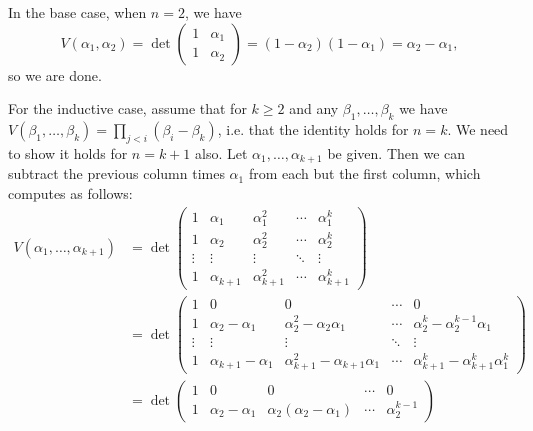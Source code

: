 \documentclass[a4paper, 11pt]{homework}
\begin{document}
\begin{questions}
\begin{solution}
		In the base case, when \(n = 2\), we have
		\[
			V(\alpha_1, \alpha_2) = \det\begin{pmatrix}
				1 & \alpha_1 \\
				1 & \alpha_2
			\end{pmatrix} = (1 - \alpha_2)(1 - \alpha_1) = \alpha_2 - \alpha_1,
		\]
		so we are done.

		For the inductive case, assume that for \(k \ge 2\) and any \(\beta_1,\dots,
		\beta_k\) we have \(V(\beta_1,\dots,\beta_k) = \prod_{j < i} (\beta_i - \beta_k)\), i.e. that the identity
		holds for \(n = k\). We need to show it holds for \(n = k + 1\) also. Let \(\alpha_1,\dots,\alpha_{k+1}\)
		be given. Then we can subtract the previous column times \(\alpha_1\) from each but the first column, which
		computes as follows:
		\begin{align*}
			V(\alpha_1,\dots,\alpha_{k+1})
			 & = \det\begin{pmatrix}
				1      & \alpha_1     & \alpha_1^2     & \cdots & \alpha_1^k     \\
				1      & \alpha_2     & \alpha_2^2     & \cdots & \alpha_2^k     \\
				\vdots & \vdots       & \vdots         & \ddots & \vdots         \\
				1      & \alpha_{k+1} & \alpha_{k+1}^2 & \cdots & \alpha_{k+1}^k
			\end{pmatrix} \\
			 & = \det\begin{pmatrix}
				1      & 0                       & 0                                     & \cdots & 0                \\
				1      & \alpha_2 - \alpha_1     & \alpha_2^2 - \alpha_2\alpha_1         & \cdots & \alpha_2^k -
				\alpha_2^{k-1}\alpha_1                                                                               \\
				\vdots & \vdots                  & \vdots                                & \ddots & \vdots           \\
				1      & \alpha_{k+1} - \alpha_1 & \alpha_{k+1}^2 - \alpha_{k+1}\alpha_1 & \cdots & \alpha_{k+1}^k -
				\alpha_{k+1}^k \alpha_1^k
			\end{pmatrix} \\
			 & = \det\begin{pmatrix}
				1      & 0                       & 0                                     & \cdots & 0                   \\
				1      & \alpha_2 - \alpha_1     & \alpha_2(\alpha_2 - \alpha_1)         & \cdots & \alpha_2^{k-1}

\end{pmatrix}
\end{align*}
\end{solution}
\end{questions}
\end{document}
